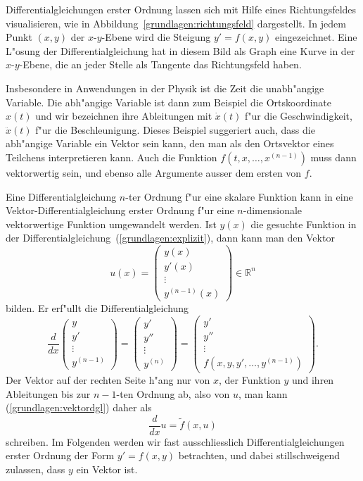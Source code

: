 Differentialgleichungen erster Ordnung lassen sich mit Hilfe eines
Richtungsfeldes visualisieren, wie in Abbildung~\ref{grundlagen:richtungsfeld}
dargestellt.
In jedem Punkt $(x,y)$ der $x$-$y$-Ebene wird die Steigung $y'=f(x,y)$
eingezeichnet.
Eine L"osung der Differentialgleichung hat in diesem Bild als Graph
eine Kurve in der $x$-$y$-Ebene, die an jeder Stelle als Tangente 
das Richtungsfeld haben.

Insbesondere in Anwendungen in der Physik ist die Zeit die
unabh"angige Variable.
Die abh"angige Variable ist dann zum Beispiel die Ortskoordinate
$x(t)$ und wir bezeichnen ihre Ableitungen mit $\dot{x}(t)$ f"ur
die Geschwindigkeit, $\ddot{x}(t)$ f"ur die Beschleunigung.
Dieses Beispiel suggeriert auch, dass die abh"angige Variable 
ein Vektor sein kann, den man als den Ortsvektor eines Teilchens
interpretieren kann.
Auch die Funktion $f(t,x,\dots,x^{(n-1)})$ muss dann vektorwertig sein, und
ebenso alle Argumente ausser dem ersten von $f$.

Eine Differentialgleichung $n$-ter Ordnung f"ur eine skalare Funktion
kann in eine Vektor-Differen\-tialgleichung erster Ordnung f"ur eine
$n$-dimensionale vektorwertige Funktion umgewandelt werden.
Ist $y(x)$ die gesuchte Funktion in der
Differentialgleichung~(\ref{grundlagen:explizit}), dann kann man
den Vektor
\[
u(x)=\begin{pmatrix}
y(x)\\y'(x)\\\vdots\\y^{(n-1)}(x)
\end{pmatrix}
\in\mathbb R^n
\]
bilden.
Er erf"ullt die Differentialgleichung
\begin{equation}
\frac{d}{dx}\begin{pmatrix}
y\\y'\\\vdots\\y^{(n-1)}
\end{pmatrix}
=
\begin{pmatrix}
y'\\y''\\\vdots\\y^{(n)}
\end{pmatrix}
=
\begin{pmatrix}
y'\\y''\\\vdots\\f(x,y,y',\dots,y^{(n-1)})
\end{pmatrix}.
\label{grundlagen:vektordgl}
\end{equation}
Der Vektor auf der rechten Seite h"ang nur von $x$, der Funktion $y$
und ihren Ableitungen bis zur $n-1$-ten Ordnung ab, also von $u$, man
kann (\ref{grundlagen:vektordgl}) daher als
\begin{equation}
\frac{d}{dx}u=\tilde{f}(x,u)
\end{equation}
schreiben.
Im Folgenden werden wir fast ausschliesslich Differentialgleichungen
erster Ordnung der Form $y'=f(x,y)$ betrachten, und dabei stillschweigend
zulassen, dass $y$ ein Vektor ist.


